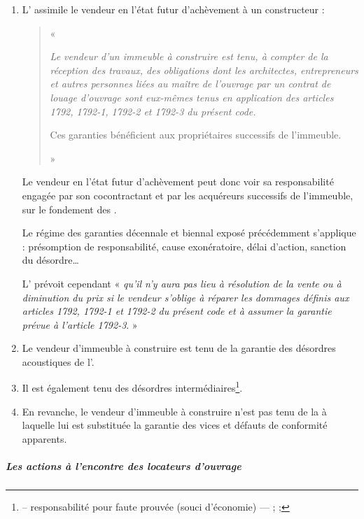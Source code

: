 					\begin{enumerate}
						\item L’ assimile le vendeur en l’état futur d’achèvement à un constructeur :
						\begin{quote}
							« {\itshape Le vendeur d'un immeuble à construire est tenu, à compter de la réception des travaux, des obligations dont les architectes, entrepreneurs et autres personnes liées au maître de l'ouvrage par un contrat de louage d'ouvrage sont eux-mêmes tenus en application des articles 1792, 1792-1, 1792-2 et 1792-3 du présent code.

							Ces garanties bénéficient aux propriétaires successifs de l'immeuble.} »
						\end{quote}

						Le vendeur en l’état futur d’achèvement peut donc voir sa responsabilité engagée par son cocontractant et par les acquéreurs successifs de l’immeuble, sur le fondement des .

						Le régime des garanties décennale et biennal exposé précédemment s’applique : présomption de responsabilité, cause exonératoire, délai d’action, sanction du désordre…

						L’ prévoit cependant « {\itshape qu’il n'y aura pas lieu à résolution de la vente ou à diminution du prix si le vendeur s'oblige à réparer les dommages définis aux articles 1792, 1792-1 et 1792-2 du présent code et à assumer la garantie prévue à l'article 1792-3}. »


						\item  Le vendeur d’immeuble à construire est tenu de la garantie des désordres acoustiques de l’.

						\item Il est également tenu des désordres intermédiaires\footnote{ – responsabilité pour faute prouvée (souci d’économie) ---  ;  ; }.

						\item  En revanche, le vendeur d’immeuble à construire n’est pas tenu de la \gpa à laquelle lui est substituée la garantie des vices et défauts de conformité apparents.

					\end{enumerate}

				\subparagraph{Les actions à l'encontre des locateurs d'ouvrage}

